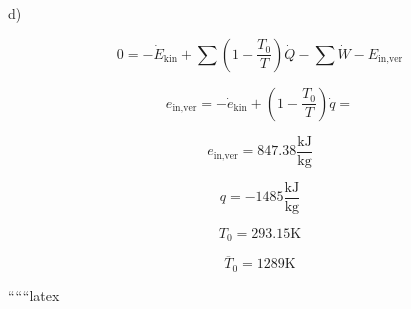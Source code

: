 d) \quad {}

\[
0 = -\dot{E}_{\text{kin}} + \sum \left( 1 - \frac{T_0}{T} \right) \dot{Q} - \sum \dot{W} - E_{\text{in,ver}}
\]

\[
e_{\text{in,ver}} = -\dot{e}_{\text{kin}} + \left( 1 - \frac{T_0}{T} \right) \dot{q} = 
\]

\[
e_{\text{in,ver}} = 847.38 \frac{\text{kJ}}{\text{kg}}
\]

\[
q = -1485 \frac{\text{kJ}}{\text{kg}}
\]

\[
T_0 = 293.15 \text{K}
\]

\[
\overline{T}_0 = 1289 \text{K}
\]

``````latex